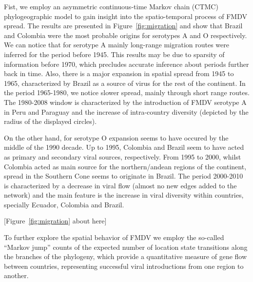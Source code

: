 \documentclass[10pt]{article}
\begin{document}
Fist, we employ an asymmetric continuous-time Markov chain (CTMC) phylogeographic model \cite{roots} to gain insight into the spatio-temporal process of FMDV spread.
The results are presented in Figure~\ref{fig:migration} and show that Brazil and Colombia were the most probable origins for serotypes A and O respectively.
We can notice that for serotype A mainly long-range migration routes were inferred for the period before 1945.
This results may be due to sparsity of information before 1970, which precludes accurate inference about periods further back in time. 
Also, there is a major expansion in spatial spread from 1945 to 1965, characterized by Brazil as a source of virus for the rest of the continent.
In the period 1965-1980, we notice slower spread, mainly through short range routes.
The 1980-2008 window is characterized by the introduction of FMDV serotype A in Peru and Paraguay and the increase of intra-country diversity (depicted by the radius of the displayed circles). %

On the other hand, for serotype O expansion seems to have occured by the middle of the 1990 decade.
Up to 1995, Colombia and Brazil seem to have acted as primary and secondary viral sources, respectively.
From 1995 to 2000, whilst Colombia acted as main source for the northern/andean regions of the continent, spread in the Southern Cone seems to originate in Brazil.
The period 2000-2010 is characterized by a decrease in viral flow (almost no new edges added to the network) and the main feature is the increase in viral diversity within countries, specially Ecuador, Colombia and Brazil.

\begin{center}
 [Figure~\ref{fig:migration} about here]
\end{center}

To further explore the spatial behavior of FMDV we employ the so-called ``Markov jump'' counts \cite{Minin2008} of the expected number of location state transitions along the  branches of the phylogeny, which  provide a quantitative measure of gene flow between countries, representing successful viral introductions from one region to another.
\end{document}

